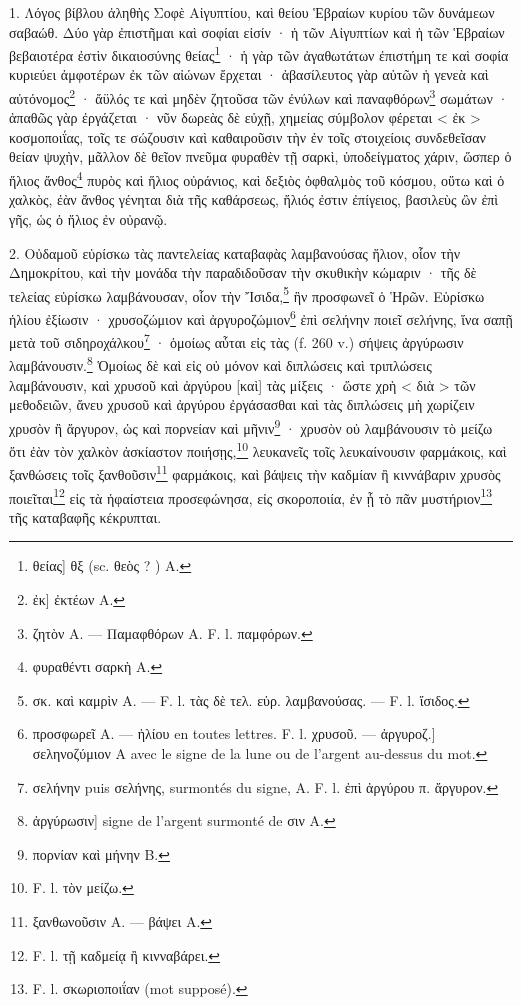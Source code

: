 \documentclass[a4paper, 11pt, oneside, polutonikogreek, french]{article}
\begin{document}
\bigskip

1. Λόγος βίβλου ἀληθὴς Σοφὲ Αἰγυπτίου, καὶ θείου Ἑβραίων κυρίου τῶν δυνάμεων σαβαώθ. Δύο γὰρ ἐπιστῆμαι καὶ σοφίαι εἰσίν · ἡ τῶν Αἰγυπτίων καὶ ἡ τῶν Ἑβραίων βεβαιοτέρα ἐστὶν δικαιοσύνης θείας\footnote{θείας] θξ (sc. θεὸς ? ) A.} · ἡ γὰρ τῶν ἀγαθωτάτων ἐπιστήμη τε καὶ σοφία κυριεύει ἀμφοτέρων ἐκ τῶν αἰώνων ἔρχεται · ἀβασίλευτος γὰρ αὐτῶν ἡ γενεὰ καὶ αὐτόνομος\footnote{ἐκ] ἐκτέων A.} · ἄϋλός τε καὶ μηδὲν ζητοῦσα τῶν ἐνύλων καὶ παναφθόρων\footnote{ζητὸν A. --- Παμαφθόρων A. F. l. παμφόρων.} σωμάτων · ἀπαθῶς γὰρ ἐργάζεται · νῦν δωρεὰς δὲ εὐχῇ, χημείας σύμβολον φέρεται < ἐκ > κοσμοποιΐας, τοῖς τε σώζουσιν καὶ καθαιροῦσιν τὴν ἐν τοῖς στοιχείοις συνδεθεῖσαν θείαν ψυχὴν, μᾶλλον δὲ θεῖον πνεῦμα φυραθὲν τῇ σαρκὶ, ὑποδείγματος χάριν, ὥσπερ ὁ ἥλιος ἄνθος\footnote{φυραθέντι σαρκὴ A.} πυρὸς καὶ ἥλιος οὐράνιος, καὶ δεξιὸς ὀφθαλμὸς τοῦ κόσμου, οὕτω καὶ ὁ χαλκὸς, ἐὰν ἄνθος γένηται διὰ τῆς καθάρσεως, ἥλιός ἐστιν ἐπίγειος, βασιλεὺς ὢν ἐπὶ γῆς, ὡς ὁ ἥλιος ἐν οὐρανῷ.

2. Οὐδαμοῦ εὑρίσκω τὰς παντελείας καταβαφὰς λαμβανούσας ἥλιον, οἷον τὴν Δημοκρίτου, καὶ τὴν μονάδα τὴν παραδιδοῦσαν τὴν σκυθικὴν κώμαριν · τῆς δὲ τελείας εὑρίσκω λαμβάνουσαν, οἷον τὴν Ἴσιδα,\footnote{σκ. καὶ καμρὶν A. --- F. l. τὰς δὲ τελ. εὑρ. λαμβανούσας. --- F. l. ἴσιδος.} ἣν προσφωνεῖ ὁ Ἡρῶν. Εὑρίσκω ἡλίου ἐξίωσιν · χρυσοζώμιον καὶ ἀργυροζώμιον\footnote{προσφωρεῖ A. --- ἡλίου en toutes lettres. F. l. χρυσοῦ. --- ἀργυροζ.] σεληνοζύμιον A avec le signe de la lune ou de l'argent au-dessus du mot.} ἐπὶ σελήνην ποιεῖ σελήνης, ἵνα σαπῇ μετὰ τοῦ σιδηροχάλκου\footnote{σελήνην puis σελήνης, surmontés du signe, A. F. l. ἐπὶ ἀργύρου π. ἄργυρον.} · ὁμοίως αὗται εἰς τὰς (f. 260 v.) σήψεις ἀργύρωσιν λαμβάνουσιν.\footnote{ἀργύρωσιν] signe de l'argent surmonté de σιν A.} Ὁμοίως δὲ καὶ εἰς οὐ μόνον καὶ διπλώσεις καὶ τριπλώσεις λαμβάνουσιν, καὶ χρυσοῦ καὶ ἀργύρου [καὶ] τὰς μίξεις · ὥστε χρὴ < διὰ > τῶν μεθοδειῶν, ἄνευ χρυσοῦ καὶ ἀργύρου ἐργάσασθαι καὶ τὰς διπλώσεις μὴ χωρίζειν χρυσὸν ἢ ἄργυρον, ὡς καὶ πορνείαν καὶ μῆνιν\footnote{πορνίαν καὶ μήνην B.} · χρυσὸν οὐ λαμβάνουσιν τὸ μείζω ὅτι ἐὰν τὸν χαλκὸν ἀσκίαστον ποιήσῃς,\footnote{F. l. τὸν μείζω.} λευκανεῖς τοῖς λευκαίνουσιν φαρμάκοις, καὶ ξανθώσεις τοῖς ξανθοῦσιν\footnote{ξανθωνοῦσιν A. --- βάψει A.} φαρμάκοις, καὶ βάψεις τὴν καδμίαν ἢ κιννάβαριν χρυσὸς ποιεῖται\footnote{F. l. τῇ καδμείᾳ ἢ κινναβάρει.} εἰς τὰ ἡφαίστεια προσεφώνησα, εἰς σκοροποιία, ἐν ᾗ τὸ πᾶν μυστήριον\footnote{F. l. σκωριοποιΐαν (mot supposé).} τῆς καταβαφῆς κέκρυπται.
\end{document}
